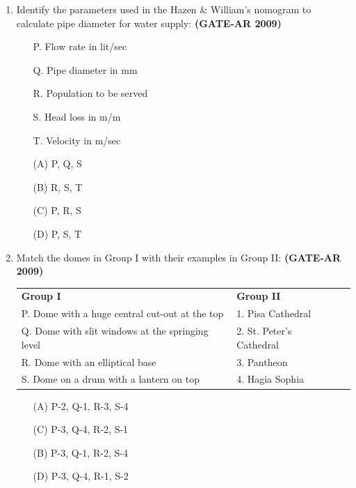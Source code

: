 \documentclass[a4paper,10pt]{article}
\begin{document}
\begin{enumerate}
    \item Identify the parameters used in the Hazen \& William’s nomogram to calculate pipe diameter for water supply: \hfill \textbf{(GATE-AR 2009)}
    \begin{itemize}
        \item[P.] Flow rate in lit/sec
        \item[Q.] Pipe diameter in mm
        \item[R.] Population to be served
        \item[S.] Head loss in m/m
        \item[T.] Velocity in m/sec
    \end{itemize}
    \begin{multicols}{4}
	\begin{itemize}
        \item[(A)] P, Q, S
        \item[(B)] R, S, T
        \item[(C)] P, R, S
        \item[(D)] P, S, T
    \end{itemize}
	\end{multicols}

    \item Match the domes in Group I with their examples in Group II: \hfill \textbf{(GATE-AR 2009)} \\
    \begin{tabular}{pl{\dimexpr\columnwidth-2\tabcolsep} p{\dimexpr\columnwidth-2\tabcolsep} }
	\textbf{Group I} & \textbf{Group II} \\
	P. Dome with a huge central cut-out at the top & 1. Pisa Cathedral \\
	Q. Dome with slit windows at the springing level & 2. St. Peter’s Cathedral \\
	R. Dome with an elliptical base & 3. Pantheon \\
	S. Dome on a drum with a lantern on top & 4. Hagia Sophia \\
	\end{tabular}
	\begin{multicols}{2}
	\begin{itemize}
        \item[(A)] P-2, Q-1, R-3, S-4
        \item[(C)] P-3, Q-4, R-2, S-1
        \item[(B)] P-3, Q-1, R-2, S-4
        \item[(D)] P-3, Q-4, R-1, S-2
    \end{itemize}
	\end{multicols}


\end{enumerate}
\end{document}

